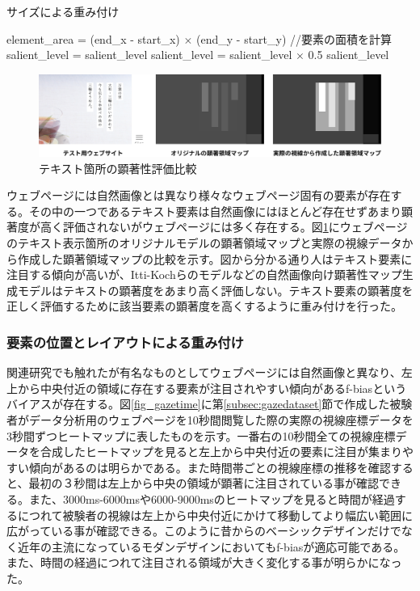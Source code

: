 \begin{algorithm}[H]
  \small
  \caption{サイズによる重み付け}
  \label{alg:weight-size}
  \begin{algorithmic}
  \State element\_area =  (end\_x - start\_x) $\times$ (end\_y - start\_y) //要素の面積を計算
    \State salient\_level = salient\_level
  \Else
    \State salient\_level = salient\_level $\times$ 0.5
  \EndIf
  \State \Return salient\_level
  \EndFunction
  \end{algorithmic}
\end{algorithm}

\begin{figure}[H]
  \centering
  \includegraphics[width=12cm]{figures/06_textbias.jpg}
  \caption{テキスト箇所の顕著性評価比較}
  \label{fig_textbias}
\end{figure}

\par ウェブページには自然画像とは異なり様々なウェブページ固有の要素が存在する。その中の一つであるテキスト要素は自然画像にはほとんど存在せずあまり顕著度が高く評価されないがウェブページには多く存在する。図\ref{fig_textbias}にウェブページのテキスト表示箇所のオリジナルモデルの顕著領域マップと実際の視線データから作成した顕著領域マップの比較を示す。図から分かる通り人はテキスト要素に注目する傾向が高いが、Itti-Kochらのモデルなどの自然画像向け顕著性マップ生成モデルはテキストの顕著度をあまり高く評価しない。テキスト要素の顕著度を正しく評価するために該当要素の顕著度を高くするように重み付けを行った。


\subsubsection{要素の位置とレイアウトによる重み付け}\label{subsec:system03-2}
\par 関連研究でも触れたが有名なものとしてウェブページには自然画像と異なり、左上から中央付近の領域に存在する要素が注目されやすい傾向があるf-biasというバイアスが存在する。図\ref{fig_gazetime}に第\ref{subsec:gazedataset}節で作成した被験者がデータ分析用のウェブページを10秒間閲覧した際の実際の視線座標データを3秒間ずつヒートマップに表したものを示す。一番右の10秒間全ての視線座標データを合成したヒートマップを見ると左上から中央付近の要素に注目が集まりやすい傾向があるのは明らかである。また時間帯ごとの視線座標の推移を確認すると、最初の３秒間は左上から中央の領域が顕著に注目されている事が確認できる。また、3000ms-6000msや6000-9000msのヒートマップを見ると時間が経過するにつれて被験者の視線は左上から中央付近にかけて移動してより幅広い範囲に広がっている事が確認できる。このように昔からのベーシックデザインだけでなく近年の主流になっているモダンデザインにおいてもf-biasが適応可能である。また、時間の経過につれて注目される領域が大きく変化する事が明らかになった。

